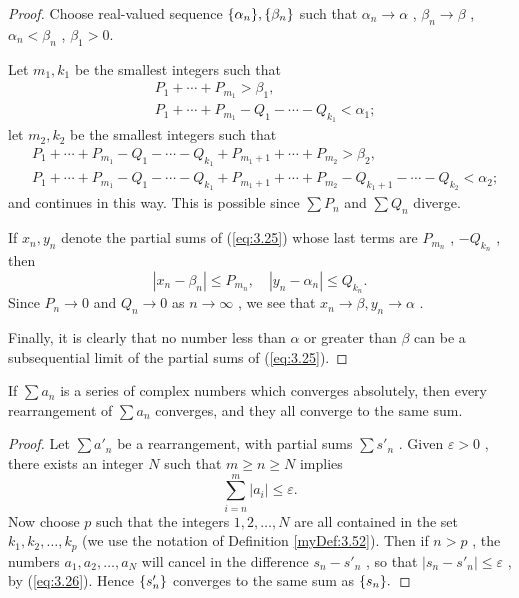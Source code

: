 \begin{proof}
    Choose real-valued sequence $\protect\{\alpha_n\}, \protect\{\beta_n\}$ such that $\alpha_n \rightarrow \alpha$ , $\beta_n \rightarrow \beta$ ,
    $\alpha_n < \beta_n$ , $\beta_1 > 0$.
    
    Let $m_1, k_1$ be the smallest integers such that
    \begin{align*}
        &P_1 + \cdots + P_{m_1} > \beta_1,\\
        &P_1 + \cdots + P_{m_1} - Q_1 - \cdots - Q_{k_1} < \alpha_1;
    \end{align*}
    let $m_2, k_2$ be the smallest integers such that
    \begin{align*}
        &P_1 + \cdots + P_{m_1} - Q_1 - \cdots - Q_{k_1} + P_{m_1 + 1} + \cdots + P_{m_2} > \beta_2,\\
        &P_1 + \cdots + P_{m_1} - Q_1 - \cdots - Q_{k_1} + P_{m_1 + 1} + \cdots + P_{m_2} - Q_{k_1 + 1} - \cdots - Q_{k_2} < \alpha_2;
    \end{align*}
    and continues in this way. This is possible since 
    $\sum P_n$ and 
    $\sum Q_n$ diverge.

    If $x_n, y_n$ denote the partial sums of (\ref{eq:3.25}) whose last terms are $P_{m_n}$ , $-Q_{k_n}$ , then 
    \begin{equation*}
        \left| x_n - \beta_n \right| \leq P_{m_n}, \quad
        \left| y_n - \alpha_n \right| \leq Q_{k_n}.
    \end{equation*}
    Since $P_n \rightarrow 0$ and $Q_n \rightarrow 0$ as $n \rightarrow \infty$ , we see that $x_n \rightarrow \beta, y_n \rightarrow \alpha$ .

    Finally, it is clearly that no number less than $\alpha$ or greater than $\beta$ can be a subsequential limit of the partial sums of (\ref{eq:3.25}).
\end{proof}

\begin{thm}
    \label{thm:3.55}
    If $\sum a_n$ is a series of complex numbers which converges absolutely,
    then every rearrangement of $\sum a_n$ converges,
    and they all converge to the same sum.
\end{thm}

\begin{proof}
    Let $\sum a'_n$ be a rearrangement, with partial sums $\sum s'_n$ .
    Given $\varepsilon > 0$ ,
    there exists an integer $N$ such that $m \geq n \geq N$ implies
    \begin{equation}
        \label{eq:3.26}
        \sum_{i=n}^{m} \left| a_i \right| \leq \varepsilon.
    \end{equation}
    Now choose $p$ such that the integers $1,2,\dots,N$ are all contained in the set $k_1, k_2, \dots, k_p$ 
    (we use the notation of Definition \ref{myDef:3.52}).
    Then if $n>p$ , the numbers $a_1, a_2, \dots, a_N$ will cancel in the difference $s_n - s'_n$ , 
    so that $\left| s_n - s'_n \right| \leq \varepsilon$ , by (\ref{eq:3.26}).
    Hence $\protect\{s'_n\}$ converges to the same sum as $\protect\{s_n\}.$  
\end{proof}